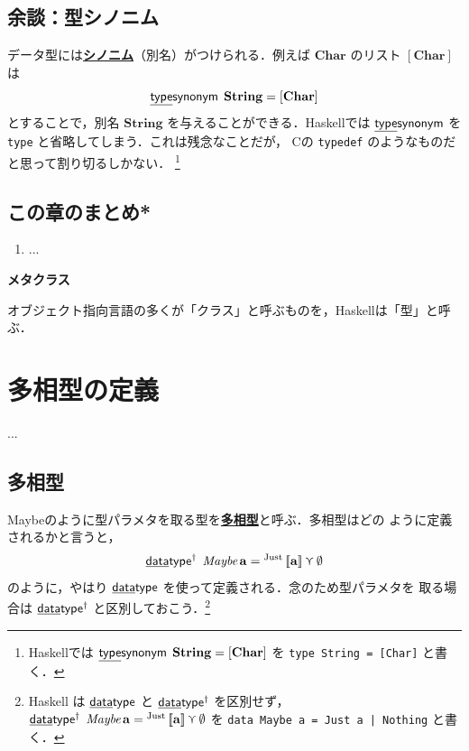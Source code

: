 \documentclass[a5paper,twoside,fleqn]{jsbook}
\def\[{\left[\!\left[}
\def\]{\right]\!\right]}
\newcommand{\programminglanguage}[1]{\textsf{#1}}
\newcommand{\clang}{\programminglanguage{C}}
\newcommand{\haskell}{\programminglanguage{Haskell}}
\newenvironment{note}[1]{\begin{boxnote}\begin{center}\textbf{#1}\end{center}}{\end{boxnote}}
\newcommand{\keyword}[1]{{\underline{\textbf{#1}}}}
\newcommand{\code}[1]{\texttt{#1}}
\newcommand{\mKeyword}[1]{\mathsf{#1}} %
\newcommand{\mKeywordUnderline}[1]{\text{\underline{\textsf{#1}}}} %
\newcommand{\mDataTypeKeyword}{\mKeywordUnderline{data}\mKeyword{type}}
\newcommand{\mTypeSynonymKeyword}{\mKeywordUnderline{type}\mKeyword{synonym}}
\DeclareMathOperator{\mDataType}{\mDataTypeKeyword}
\DeclareMathOperator{\mDataTypeParametric}{\mDataTypeKeyword^\dagger}
\DeclareMathOperator{\mTypeSynonym}{\mTypeSynonymKeyword}
\newcommand{\mNothing}{\emptyset}
\DeclareMathOperator{\mValueOr}{\curlyvee}
\newcommand{\mType}[1]{\mathbf{#1}}
\newcommand{\mCharType}{\mType{Char}}
\newcommand{\mStringType}{\mType{String}}
\newcommand{\mListType}[1]{[\mType{#1}]}
\newcommand{\mGenericTypeAssemble}[2]{{}^{\mTypeConstructor{#1}}\[\mType{#2}\]}
\newcommand{\mMaybeType}[1]{\mGenericTypeAssemble{Maybe}{#1}}
\newcommand{\mTypeConstructor}[1]{\textit{#1}}
\DeclareMathOperator{\mMaybeTypeConstructor}{\mTypeConstructor{Maybe}}
\newcommand{\mGenericValueConstructor}[1]{\mathrm{#1}}
\newcommand{\mGenericWith}[2]{{}^\mGenericValueConstructor{#1}\[#2\]}
\newcommand{\mJustWith}[1]{\mGenericWith{Just}{#1}}
\begin{document}
\section{余談：型シノニム}

データ型には\keyword{シノニム}（別名）がつけられる．例えば
$\mCharType$ のリスト $\mListType{\mCharType}$ は
\begin{equation}
\mTypeSynonym\;\mStringType=\mListType{\mCharType}
\end{equation}
とすることで，別名 $\mStringType$ を与えることができる．\haskell では
$\mTypeSynonym$ を \code{type} と省略してしまう．これは残念なことだが，
\clang の \code{typedef} のようなものだと思って割り切るしかない．
\footnote{\haskell では
$\mTypeSynonym\;\mStringType=\mListType{\mCharType}$ を \code{type
String = [Char]} と書く．}

\section{この章のまとめ*}

\begin{enumerate}
\item ...
\end{enumerate}

\begin{note}{メタクラス}
オブジェクト指向言語の多くが「クラス」と呼ぶものを，\haskell は「型」と呼ぶ．


\end{note}


\chapter{多相型の定義}
\label{ch:parametric-data-type}
...

\section{多相型}

Maybeのように型パラメタを取る型を\keyword{多相型}と呼ぶ．多相型はどの
ように定義されるかと言うと，
\begin{equation}
\mDataTypeParametric\;\mMaybeTypeConstructor\mType{a}
=\mJustWith{\mType{a}}\mValueOr\mNothing
\end{equation}
のように，やはり $\mDataType$ を使って定義される．念のため型パラメタを
取る場合は $\mDataTypeParametric$ と区別しておこう．\footnote{\haskell
は $\mDataType$ と $\mDataTypeParametric$ を区別せず，
$\mDataTypeParametric\;\mMaybeTypeConstructor\mType{a}
=\mJustWith{\mType{a}}\mValueOr\mNothing$ を \code{data Maybe a =
Just a | Nothing} と書く．}
\end{document}
